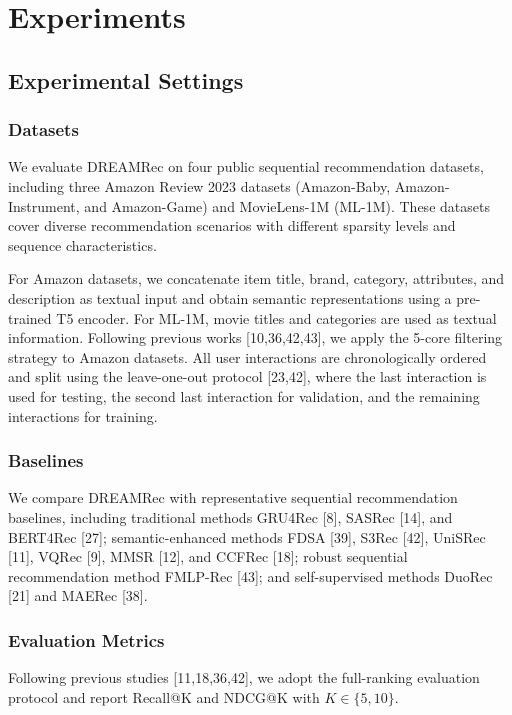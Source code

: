 \documentclass[letterpaper]{article} %
\theoremstyle{definition} %
\begin{document}
\section{Experiments}
\subsection{Experimental Settings}

\subsubsection{Datasets}

We evaluate DREAMRec on four public sequential recommendation datasets, including three Amazon Review 2023 datasets (Amazon-Baby, Amazon-Instrument, and Amazon-Game) and MovieLens-1M (ML-1M). These datasets cover diverse recommendation scenarios with different sparsity levels and sequence characteristics.

For Amazon datasets, we concatenate item title, brand, category, attributes, and description as textual input and obtain semantic representations using a pre-trained T5 encoder. For ML-1M, movie titles and categories are used as textual information. Following previous works [10,36,42,43], we apply the 5-core filtering strategy to Amazon datasets. All user interactions are chronologically ordered and split using the leave-one-out protocol [23,42], where the last interaction is used for testing, the second last interaction for validation, and the remaining interactions for training.


\subsubsection{Baselines}

We compare DREAMRec with representative sequential recommendation baselines, including traditional methods GRU4Rec [8], SASRec [14], and BERT4Rec [27]; semantic-enhanced methods FDSA [39], S3Rec [42], UniSRec [11], VQRec [9], MMSR [12], and CCFRec [18]; robust sequential recommendation method FMLP-Rec [43]; and self-supervised methods DuoRec [21] and MAERec [38].


\subsubsection{Evaluation Metrics}

Following previous studies [11,18,36,42], we adopt the full-ranking evaluation protocol and report Recall@K and NDCG@K with $K\in\{5,10\}$.
\end{document}
